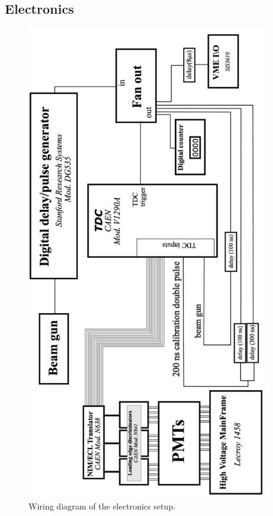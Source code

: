 \subsection{Electronics}
\label{sec:electronics}
\begin{figure}[ht!]
\centering
\includegraphics[width=0.95\textwidth, angle=\WireAngle]{WiringDiagram.png}
\caption{Wiring diagram of the electronics setup. }
\label{fig:WiringDiagram}
\end{figure}
